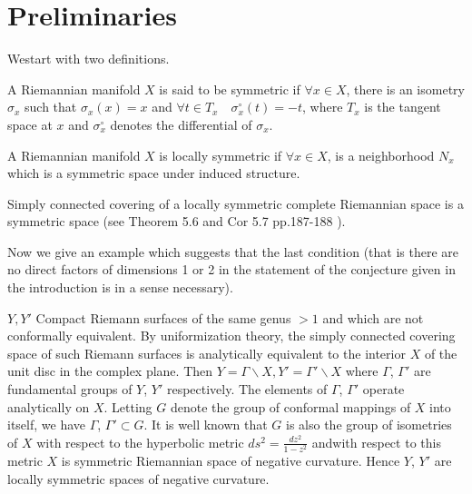 \setcounter{chapter}{-1}
\chapter{Preliminaries}\label{chap0} %

We\pageoriginale start with two definitions.


A Riemannian manifold $X$ is said to be symmetric if $\forall x
\in X$, there is an isometry $\sigma_x$ such that $\sigma_x(x)=x$
and $\forall t \in T_x \quad \sigma^\circ_x(t)=- t$, where $T_x$
is the tangent space at $x$ and $\sigma^\circ_x$ denotes the
differential of $\sigma_x$.


A Riemannian manifold $X$ is locally symmetric if $\forall x \in
X$, is a neighborhood $N_x$ which is a symmetric space under induced
structure.

\begin{remark*}
  Simply connected covering of a locally symmetric complete Riemannian
  space is a symmetric space (see Theorem 5.6 and
  Cor 5.7 pp.187-188
  \cite{8}). 
\end{remark*}

Now we give an example which suggests that the last condition (that is
there are no direct factors of dimensions 1 or 2 in the statement of
the conjecture given in the introduction is in a sense necessary).

\begin{example}\label{chap0:exp0.1} %
  $Y, Y'$ Compact Riemann surfaces of the same genus $>1$ and which are
  not conformally equivalent. By uniformization theory, the simply
  connected covering space of such Riemann surfaces is analytically
  equivalent to the interior $X$ of the unit disc in the complex
  plane. Then $Y= \Gamma\backslash X, Y' = \Gamma'\backslash X$ where
  $\Gamma$, $\Gamma'$ are fundamental groups of $Y$, $Y'$
  respectively. The elements of $\Gamma$, $\Gamma'$ operate
  analytically on $X$. Letting $G$ denote the group of conformal
  mappings of $X$ into itself, we have $\Gamma$, $\Gamma' \subset
  G$. It is well known that $G$ is also the group of isometries of $X$
  with respect to the hyperbolic metric $ds^2 = \frac{dz^2}{1-z^2}$
  and\pageoriginale with respect to this metric $X$ is symmetric
  Riemannian space of negative curvature. Hence $Y$, $Y'$ are locally
  symmetric spaces of negative curvature.
\end{example}

